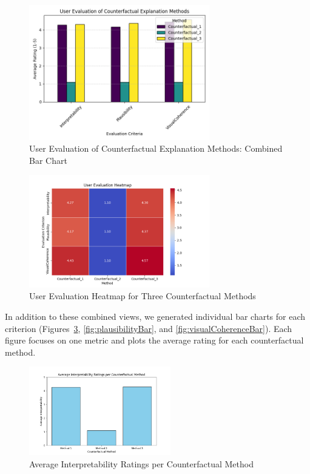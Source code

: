 \begin{figure}[htbp]
    \centering
    \includegraphics[width=0.7\textwidth]{img/results/bar_plot_user_evaluations.png}
    \caption{User Evaluation of Counterfactual Explanation Methods: Combined Bar Chart}
    \label{fig:barPlotAll}
\end{figure}

\begin{figure}[htbp]
    \centering
    \includegraphics[width=0.7\textwidth]{img/results/heatmap_user_evaluations.png}
    \caption{User Evaluation Heatmap for Three Counterfactual Methods}
    \label{fig:heatmap}
\end{figure}

In addition to these combined views, we generated individual bar charts for each criterion (Figures~\ref{fig:interpretabilityBar}, 
\ref{fig:plausibilityBar}, and \ref{fig:visualCoherenceBar}). Each figure focuses on one metric and plots the average rating 
for each counterfactual method.

\begin{figure}[htbp]
    \centering
    \includegraphics[width=0.55\textwidth]{img/results/Interpretability_ratings.png}
    \caption{Average Interpretability Ratings per Counterfactual Method}
    \label{fig:interpretabilityBar}
\end{figure}

